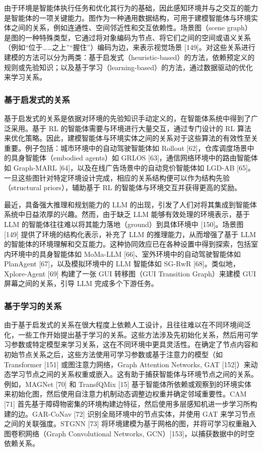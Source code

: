 \documentclass[10pt,UTF8,fontset=fandol]{ctexart}
\begin{document}
由于环境是智能体执行任务和优化其行为的基础，因此感知环境并与之交互的能力是智能体的一项关键能力。图作为一种通用数据结构，可用于建模智能体与环境实体之间的关系，例如连通性、空间邻近性和交互依赖性。场景图（scene graph）是图的一种特殊类型，它通过将对象编码为节点、将它们之间的空间或语义关系（例如“位于……之上”“握住”）编码为边，来表示视觉场景 [149]。对这些关系进行建模的方法可以分为两类：基于启发式（heuristic-based）的方法，依赖预定义的规则或先验知识；以及基于学习（learning-based）的方法，通过数据驱动的优化来学习关系。

\subsubsection{基于启发式的关系}
基于启发式的关系是依据对环境的先验知识手动定义的，在智能体系统中得到了广泛采用。基于 RL 的智能体需要与环境进行大量交互，通过专门设计的 RL 算法来优化策略。因此，建模智能体与环境实体之间的关系对于这些算法的有效性至关重要。例子包括：城市环境中的自动驾驶智能体如 Rollout [62]，仓库调度场景中的具身智能体（embodied agents）如 GRLOS [63]，通信网络环境中的路由智能体如 Graph-MARL [64]，以及在线广告场景中的自动竞价智能体如 LGD-AB [65]。一旦这些图针对特定环境设计完成，相应的关系结构便可以作为结构先验（structural priors），辅助基于 RL 的智能体与环境交互并获得更高的奖励。

最近，具备强大推理和规划能力的 LLM 的出现，引发了人们对将其集成到智能体系统中日益浓厚的兴趣。然而，由于缺乏 LLM 能够有效处理的环境表示，基于 LLM 的智能体往往难以将其能力落地（ground）到具体环境中 [150]。场景图 [149] 提供了环境的结构化表示，补充了 LLM 的推理能力，从而增强了基于 LLM 的智能体的环境理解和交互能力。这种协同效应已在各种设置中得到探索，包括室内环境中的具身智能体如 MoMa-LLM [66]、室外环境中的自动驾驶智能体如 PlanAgent [67]，以及模拟环境中的 LLM 智能体如 SG-RwR [68]。类似地，Xplore-Agent [69] 构建了一张 GUI 转移图（GUI Transition Graph）来建模 GUI 屏幕之间的关系，引导 LLM 完成多个下游任务。

\subsubsection{基于学习的关系}
由于基于启发式的关系在很大程度上依赖人工设计，且往往难以在不同环境间泛化，一些工作开始提出基于学习的关系。这些方法涉及先初始化关系，然后用可学习参数或特定模型来学习关系，这在不同环境中更具灵活性。在确定了节点内容和初始节点关系之后，这些方法使用可学习参数或基于注意力的模型（如 Transformer [151] 或图注意力网络，Graph Attention Networks, GAT [152]）来动态学习节点之间的关系权重或嵌入。这有助于捕获智能体与环境节点之间的关系。例如，MAGNet [70] 和 TransfQMix [15] 基于智能体所依赖或观察到的环境实体来初始化图，然后使用自注意力机制动态调整边权重并确定邻域重要性。CAM [71] 首先基于障碍物密集的环境构建边特征，然后使用多层感知机进一步学习所构建的边。GAR-CoNav [72] 识别全局环境中的节点实体，并使用 GAT 来学习节点之间的关联强度。STGNN [73] 将环境建模为基于网格的图，并将可学习权重融入图卷积网络（Graph Convolutional Networks, GCN）[153]，以捕获数据中的时空依赖关系。
\end{document}
